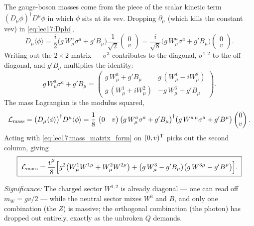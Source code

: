 The gauge-boson masses come from the piece of the scalar kinetic term $(D_\mu\phi)^\dagger D^\mu\phi$ in which $\phi$ sits at its vev. Dropping $\partial_\mu$ (which kills the constant vev) in \eqref{eq:lec17:Dphi},
\begin{equation}
  D_\mu\langle\phi\rangle
  =\frac{i}{2}\Big(g\,W^a_\mu\sigma^a+g'B_\mu\Big)\frac{1}{\sqrt2}\begin{pmatrix}0\\v\end{pmatrix}
  =\frac{i}{\sqrt8}\Big(g\,W^a_\mu\sigma^a+g'B_\mu\Big)\begin{pmatrix}0\\v\end{pmatrix} .
  \label{eq:lec17:Dvev}
\end{equation}
Writing out the $2\times2$ matrix --- $\sigma^3$ contributes to the diagonal, $\sigma^{1,2}$ to the off-diagonal, and $g'B_\mu$ multiplies the identity:
\begin{equation}
  g\,W^a_\mu\sigma^a+g'B_\mu
  =\begin{pmatrix}
    g\,W^3_\mu+g'B_\mu & g\,(W^1_\mu-iW^2_\mu)\\[4pt]
    g\,(W^1_\mu+iW^2_\mu) & -g\,W^3_\mu+g'B_\mu
  \end{pmatrix} .
  \label{eq:lec17:mass_matrix_form}
\end{equation}
The mass Lagrangian is the modulus squared,
\begin{equation}
  \mathcal{L}_{\rm mass}
  =\big(D_\mu\langle\phi\rangle\big)^\dagger D^\mu\langle\phi\rangle
  =\frac{1}{8}\,
  \begin{pmatrix}0&v\end{pmatrix}
  \big(g\,W^a_\mu\sigma^a+g'B_\mu\big)^\dagger
  \big(g\,W^{a\,\mu}\sigma^a+g'B^\mu\big)
  \begin{pmatrix}0\\v\end{pmatrix} .
  \label{eq:lec17:mass_lagrangian}
\end{equation}
Acting with \eqref{eq:lec17:mass_matrix_form} on $(0,v)^{\rm T}$ picks out the second column, giving
\begin{equation}
  \boxed{\;
  \mathcal{L}_{\rm mass}
  =\frac{v^2}{8}\Big[g^2\big(W^1_\mu W^{1\mu}+W^2_\mu W^{2\mu}\big)
  +\big(g\,W^3_\mu-g'B_\mu\big)\big(g\,W^{3\mu}-g'B^\mu\big)\Big] .
  \;}
  \label{eq:lec17:mass_quadratic_form}
\end{equation}

\textit{Significance:} The charged sector $W^{1,2}$ is already diagonal --- one can read off $m_W=gv/2$ --- while the neutral sector mixes $W^3$ and $B$, and only one combination (the $Z$) is massive; the orthogonal combination (the photon) has dropped out entirely, exactly as the unbroken $Q$ demands.

